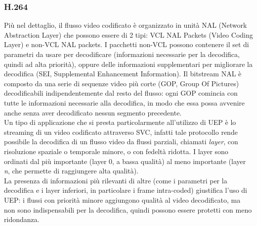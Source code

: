 \documentclass[italian, a4paper, 12pt]{article}
\begin{document}
\subsubsection{H.264}
Più nel dettaglio, il flusso video codificato è organizzato in unità NAL (Network Abstraction Layer) che possono essere di 2 tipi: VCL NAL Packets (Video Coding Layer) e non-VCL NAL packets. I pacchetti non-VCL possono contenere il set di parametri da usare per decodificare (informazioni necessarie per la decodifica, quindi ad alta priorità), oppure delle informazioni supplementari per migliorare la decodifica (SEI, Supplemental Enhancement Information). Il bitstream NAL è composto da una serie di sequenze video più corte (GOP, Group Of Pictures) decodificabili indipendentemente dal resto del flusso: ogni GOP comincia con tutte le informazioni necessarie alla decodifica, in modo che essa possa avvenire anche senza aver decodificato nessun segmento precedente.\\
Un tipo di applicazione che si presta particolarmente all'utilizzo di UEP \cite{uep} è lo streaming di un video codificato attraverso SVC, infatti tale protocollo rende possibile la decodifica di un flusso video da flussi parziali, chiamati \textit{layer}, con risoluzione spaziale o temporale minore, o con fedeltà ridotta. I layer sono ordinati dal più importante (layer 0, a bassa qualità) al meno importante (layer \textit{n}, che permette di raggiungere alta qualità).\\
La presenza di informazioni più rilevanti di altre (come i parametri per la decodifica e i layer inferiori, in particolare i frame intra-coded) giustifica l'uso di UEP: i flussi con priorità minore aggiungono qualità al video decodificato, ma non sono indispensabili per la decodifica, quindi possono essere protetti con meno ridondanza.
\end{document}
